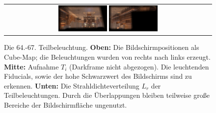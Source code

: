 \begin{figure}[H]
\begin{tabular}{c}
      \includegraphics[width=0.24\textwidth]{../graphics/ergebnisse/result_screen_65.jpg}
      \includegraphics[width=0.24\textwidth]{../graphics/ergebnisse/result_screen_64.jpg}
 
    \end{tabular}
    \caption[Ergebnis: Szene 1 (vier Teilbeleuchtungen)]{ Die 64.-67. Teilbeleuchtung. \textbf{Oben:} Die Bildschirmpositionen als Cube-Map; die Beleuchtungen wurden von rechts nach links erzeugt. \textbf{Mitte:} Aufnahme $T_i$ (Darkframe nicht abgezogen). Die leuchtenden Fiducials, sowie der hohe Schwarzwert des Bildschirms sind zu erkennen.
   \textbf{Unten:} Die Strahldichteverteilung $L_r$ der Teilbeleuchtungen. Durch die Überlappungen bleiben teilweise große Bereiche der Bildschirmfläche ungenutzt. }
    \label{fig:result_parts}
   \end{figure}



